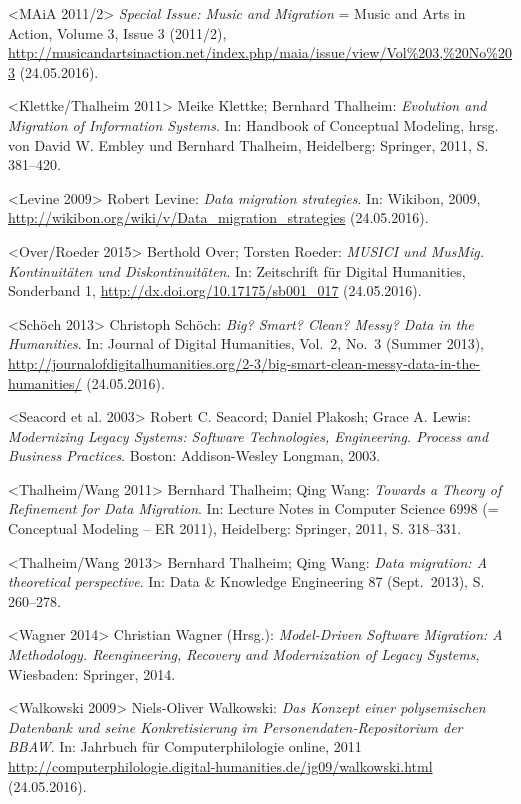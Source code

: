 \documentclass[a4paper,
fontsize=11pt,
oneside,
numbers=noperiodatend,
parskip=half-,
bibliography=totoc,
final
]{scrartcl}
\begin{document}
\textless{}MAiA 2011/2\textgreater{} \emph{Special Issue: Music and
Migration} = Music and Arts in Action, Volume 3, Issue 3 (2011/2),
\url{http://musicandartsinaction.net/index.php/maia/issue/view/Vol\%203,\%20No\%203}
(24.05.2016).

\textless{}Klettke/Thalheim 2011\textgreater{} Meike Klettke; Bernhard
Thalheim: \emph{Evolution and Migration of Information Systems}. In:
Handbook of Conceptual Modeling, hrsg. von David W. Embley und Bernhard
Thalheim, Heidelberg: Springer, 2011, S. 381--420.

\textless{}Levine 2009\textgreater{} Robert Levine: \emph{Data migration
strategies}. In: Wikibon, 2009,
\url{http://wikibon.org/wiki/v/Data_migration_strategies} (24.05.2016).

\textless{}Over/Roeder 2015\textgreater{} Berthold Over; Torsten Roeder:
\emph{MUSICI und MusMig. Kontinuitäten und Diskontinuitäten}. In:
Zeitschrift für Digital Humanities, Sonderband 1,
\url{http://dx.doi.org/10.17175/sb001_017} (24.05.2016).

\textless{}Schöch 2013\textgreater{} Christoph Schöch: \emph{Big? Smart?
Clean? Messy? Data in the Humanities}. In: Journal of Digital
Humanities, Vol.~2, No.~3 (Summer 2013),
\url{http://journalofdigitalhumanities.org/2-3/big-smart-clean-messy-data-in-the-humanities/}
(24.05.2016).

\textless{}Seacord et al. 2003\textgreater{} Robert C. Seacord; Daniel
Plakosh; Grace A. Lewis: \emph{Modernizing Legacy Systems: Software
Technologies, Engineering. Process and Business Practices}. Boston:
Addison-Wesley Longman, 2003.

\textless{}Thalheim/Wang 2011\textgreater{} Bernhard Thalheim; Qing
Wang: \emph{Towards a Theory of Refinement for Data Migration}. In:
Lecture Notes in Computer Science 6998 (= Conceptual Modeling -- ER
2011), Heidelberg: Springer, 2011, S. 318--331.

\textless{}Thalheim/Wang 2013\textgreater{} Bernhard Thalheim; Qing
Wang: \emph{Data migration: A theoretical perspective}. In: Data \&
Knowledge Engineering 87 (Sept.~2013), S. 260--278.

\textless{}Wagner 2014\textgreater{} Christian Wagner (Hrsg.):
\emph{Model-Driven Software Migration: A Methodology. Reengineering,
Recovery and Modernization of Legacy Systems}, Wiesbaden: Springer,
2014.

\textless{}Walkowski 2009\textgreater{} Niels-Oliver Walkowski:
\emph{Das Konzept einer polysemischen Datenbank und seine
Konkretisierung im Personendaten-Repositorium der BBAW}. In: Jahrbuch
für Computerphilologie online, 2011
\url{http://computerphilologie.digital-humanities.de/jg09/walkowski.html}
(24.05.2016).
\end{document}
